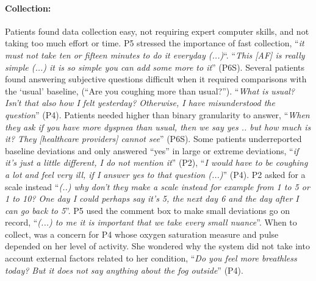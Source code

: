 \paragraph{Collection:} 
Patients found data collection easy, not requiring expert computer skills, and not taking too much effort or time. P5 stressed the importance of fast collection, “\textit{it must not take ten or fifteen minutes to do it everyday (...)}“. “\textit{This [AF] is really simple (...) it is so simple you can add some more to it}” (P6S). Several patients found answering subjective questions difficult when it required comparisons with the ‘usual’ baseline, (“Are you coughing more than usual?”). “\textit{What is usual? Isn’t that also how I felt yesterday? Otherwise, I have misunderstood the question}” (P4). Patients needed higher than binary granularity to answer, “\textit{When they ask if you have more dyspnea than usual, then we say yes .. but how much is it? They [healthcare providers] cannot see}” (P6S). Some patients underreported baseline deviations and only answered “yes” in large or extreme deviations, “\textit{if it’s just a little different, I do not mention it}” (P2),  “\textit {I would have to be coughing a lot and feel very ill, if I answer yes to that question (...)}” (P4). P2 asked for a scale instead “\textit{(..) why don’t they make a scale instead for example from 1 to 5 or 1 to 10? One day I could perhaps say it’s 5, the next day 6 and the day after I can go back to 5}”. P5 used the comment box to make small deviations go on record, “\textit{(...) to me it is important that we take every small nuance}”.  When to collect, was a concern for P4 whose oxygen saturation measure and pulse depended on her level of activity. She wondered why the system did not take into account external factors related to her condition, “\textit{Do you feel more breathless today? But it does not say anything about the fog outside}” (P4). 

